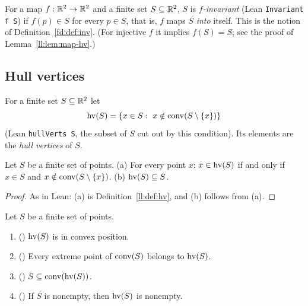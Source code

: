 \begin{definition}
\label{ll:def:inv}
For a map $f:\mathbb R^2\to\mathbb R^2$ and a finite set $S\subseteq\mathbb R^2$, $S$ is \emph{$f$-invariant} (Lean
\texttt{Invariant f S}) if $f(p)\in S$ for every $p\in S$, that is, $f$ maps $S$ \emph{into} itself. This is the notion of
Definition~\ref{fd:def:inv}. (For injective $f$ it implies $f(S)=S$; see the proof of Lemma~\ref{ll:lem:map-hv}.)
\end{definition}

\subsection{Hull vertices}

\begin{definition}
\label{ll:def:hv}
For a finite set $S\subseteq\mathbb R^2$ let
\[\hv(S)=\{x\in S:\ x\notin\conv(S\setminus\{x\})\}\]
(Lean \texttt{hullVerts S}, the subset of $S$ cut out by this condition). Its elements are the \emph{hull vertices} of
$S$.
\end{definition}

\begin{lemma}\label{ll:lem:hv-basic}
Let $S$ be a finite set of points. (a) For every point $x$: $x\in\operatorname{hv}(S)$ if and only if $x\in S$ and
$x\notin\operatorname{conv}(S\setminus\{x\})$. (b) $\operatorname{hv}(S)\subseteq S$.
\end{lemma}

\begin{proof}
As in Lean: (a) is Definition~\ref{ll:def:hv}, and (b) follows from (a).
\end{proof}

\begin{lemma}\label{ll:lem:hv}
Let $S$ be a finite set of points.
\begin{enumerate}[label=(\alph*)]
\item () $\operatorname{hv}(S)$ is in convex position.
\item () Every extreme point of $\operatorname{conv}(S)$ belongs to $\operatorname{hv}(S)$.
\item () $S\subseteq\operatorname{conv}(\operatorname{hv}(S))$.
\item () If $S$ is nonempty, then $\operatorname{hv}(S)$ is nonempty.
\end{enumerate}
\end{lemma}

